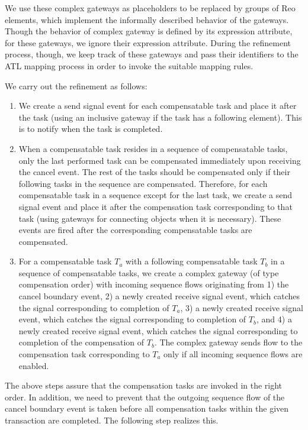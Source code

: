 We use these complex gateways as placeholders to be replaced by groups of Reo elements, which implement the informally described behavior of the gateways. Though the behavior of complex gateway is defined by its {expression} attribute, for these gateways, we ignore their expression attribute. During the refinement process, though, we keep track of these gateways and pass their identifiers to the ATL mapping process in order to invoke the suitable mapping rules. 

We carry out the refinement as follows:

\begin{enumerate}
\item We create a send signal event for each compensatable task and place it after the task (using an inclusive gateway if the task has a following element). This is to notify when the task is completed.
\item When a compensatable task resides in a sequence of compensatable tasks, only the last performed task can be compensated immediately upon receiving the cancel event. The rest of the tasks should be compensated only if their following tasks in the sequence are compensated. Therefore, for each compensatable task in a sequence except for the last task, we create a send signal event and place it after the compensation task corresponding to that task (using gateways for connecting objects when it is necessary). These events are fired after the corresponding compensatable tasks are compensated.
\item For a compensatable task $T_a$ with a following compensatable task $T_b$ in a sequence of compensatable tasks, we create a {complex gateway} (of type compensation order) with incoming sequence flows originating from 1) the {cancel boundary event}, 2) a newly created {receive signal event}, which catches the signal corresponding to completion of $T_a$, 3) a newly created {receive signal event}, which catches the signal corresponding to completion of $T_b$, and 4) a newly created {receive signal event}, which catches the signal corresponding to completion of the compensation of $T_b$. The {complex gateway} sends flow to the {compensation task} corresponding to $T_a$ only if all incoming sequence flows are enabled. 
\end{enumerate}

The above steps assure that the compensation tasks are invoked in the right order. In addition, we need to prevent that the outgoing sequence flow of the cancel boundary event is taken before all compensation tasks within the given transaction are completed. The following step realizes this.

